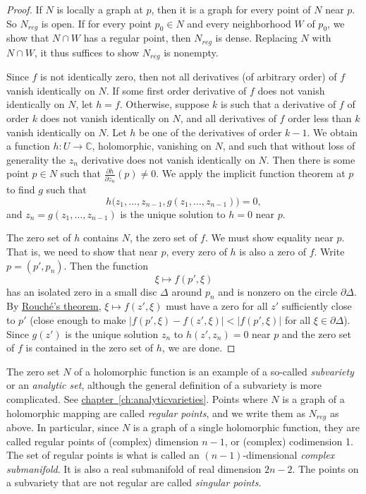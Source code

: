 \documentclass[12pt,openany]{book}
\newcommand{\sabs}[1]{\lvert {#1} \rvert}
\newcommand{\C}{{\mathbb{C}}}
\newcommand{\myindex}[1]{#1\index{#1}}
\theoremstyle{plain}
\theoremstyle{remark}
\theoremstyle{definition}
\theoremstyle{exercise}
\theoremstyle{example}
\newcommand{\chapterref}[1]{\hyperref[#1]{chapter~\ref*{#1}}}
\begin{document}
\begin{proof}
If $N$ is locally a graph at $p$, then it is a graph
for every point of $N$ near $p$.  So $N_{\mathit{reg}}$
is open.
If for every point $p_0 \in N$
and every neighborhood $W$ of $p_0$, we show that
$N \cap W$ has a regular point, then $N_{\mathit{reg}}$ is dense.
Replacing $N$ with $N \cap W$, it thus suffices to show
$N_{\mathit{reg}}$ is nonempty.

Since $f$ is not identically zero, then not all derivatives (of arbitrary
order) of $f$
vanish identically on $N$.
If some first order derivative of $f$ does not vanish identically on $N$,
let $h=f$.
Otherwise, suppose $k$ is such that a derivative of $f$ of order $k$
does not vanish identically on $N$, and
all derivatives of $f$ order less than $k$ vanish identically on
$N$.  Let $h$ be one of the derivatives of order $k-1$.
We obtain a function $h \colon U \to \C$, holomorphic, vanishing on $N$,
and such that
without loss of generality the $z_n$ derivative does not vanish identically
on $N$.  Then there is some point $p \in N$ such that $\frac{\partial
h}{\partial z_n}(p) \not= 0$.
We apply the implicit function theorem at $p$ to find $g$ such that
\begin{equation*}
h\bigr(z_1,\ldots,z_{n-1},g(z_1,\ldots,z_{n-1})\bigr) = 0 ,
\end{equation*}
and $z_n = g(z_1,\ldots,z_{n-1})$ is the unique solution to
$h=0$ near $p$.

The zero set of $h$ contains $N$, the zero set of $f$.
We must show equality near $p$.  That is, we need to show that
near $p$, every zero of $h$ is also a zero of $f$.
Write $p = (p',p_n)$.  Then the function
\begin{equation*}
\xi \mapsto f(p',\xi)
\end{equation*}
has an isolated zero in a small disc $\Delta$ around $p_n$ and is
nonzero on the circle $\partial \Delta$.  By
\hyperref[thm:onevarrouche]{Rouch\'e's theorem},
$\xi \mapsto f(z',\xi)$ must have a zero for all $z'$ sufficiently close to $p'$
(close enough to make $\sabs{f(p',\xi)-f(z',\xi)} < \sabs{f(p',\xi)}$ for all $\xi \in
\partial \Delta$).
Since $g(z')$ is the unique solution $z_n$ to $h(z',z_n) = 0$
near $p$ and the
zero set of $f$ is contained in the zero set of $h$, we are done.
\end{proof}

The zero set $N$ of a holomorphic function is an example of a so-called
\emph{\myindex{subvariety}}
or an \emph{\myindex{analytic set}},
although the general definition of a
subvariety is more complicated.
See \chapterref{ch:analyticvarieties}.
Points where $N$ is a graph of a holomorphic mapping are called
\emph{regular points}, and we write them as
$N_{\mathit{reg}}$ as above.  In particular,
since $N$ is a graph of a single holomorphic function, they are called
regular points of (complex) dimension $n-1$, or (complex) codimension 1.
The set of regular points is what is called an
$(n-1)$-dimensional \emph{\myindex{complex submanifold}}.
It is also a real
submanifold of real dimension $2n-2$.
The points on a subvariety that are not regular are called
\emph{singular points}.
\end{document}
